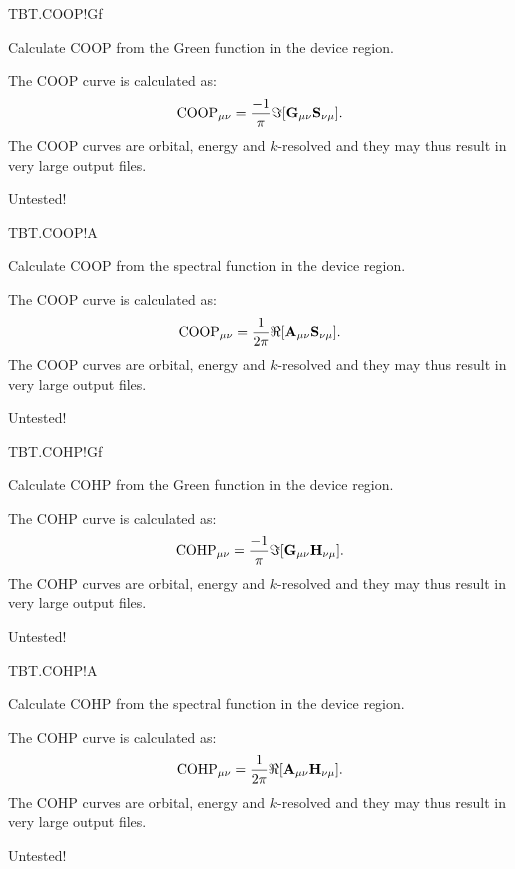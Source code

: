 \begin{fdflogicalF}{TBT.COOP!Gf}

  Calculate COOP from the Green function in the device region.

  The COOP curve is calculated as:
  \begin{equation}
    \label{eq:COOP-Gf}
    \mathrm{COOP}_{\mu\nu} = \frac{-1}\pi\Im[\mathbf G_{\mu\nu} \mathbf{S}_{\nu\mu}].
  \end{equation}
  The COOP curves are orbital, energy and $k$-resolved and they may
  thus result in very large output files.

  \note Untested!

\end{fdflogicalF}

\begin{fdflogicalF}{TBT.COOP!A}

  Calculate COOP from the spectral function in the device region.

  The COOP curve is calculated as:
  \begin{equation}
    \label{eq:COOP-A}
    \mathrm{COOP}_{\mu\nu} = \frac{1}{2\pi}\Re[\mathbf A_{\mu\nu} \mathbf{S}_{\nu\mu}].
  \end{equation}
  The COOP curves are orbital, energy and $k$-resolved and they may
  thus result in very large output files.

  \note Untested!

\end{fdflogicalF}

\begin{fdflogicalF}{TBT.COHP!Gf}

  Calculate COHP from the Green function in the device region.

  The COHP curve is calculated as:
  \begin{equation}
    \label{eq:COHP-Gf}
    \mathrm{COHP}_{\mu\nu} = \frac{-1}\pi\Im[\mathbf G_{\mu\nu} \mathbf{H}_{\nu\mu}].
  \end{equation}
  The COHP curves are orbital, energy and $k$-resolved and they may
  thus result in very large output files.

  \note Untested!

\end{fdflogicalF}

\begin{fdflogicalF}{TBT.COHP!A}

  Calculate COHP from the spectral function in the device region.

  The COHP curve is calculated as:
  \begin{equation}
    \label{eq:COHP-A}
    \mathrm{COHP}_{\mu\nu} = \frac{1}{2\pi}\Re[\mathbf A_{\mu\nu} \mathbf{H}_{\nu\mu}].
  \end{equation}
  The COHP curves are orbital, energy and $k$-resolved and they may
  thus result in very large output files.

  \note Untested!

\end{fdflogicalF}




